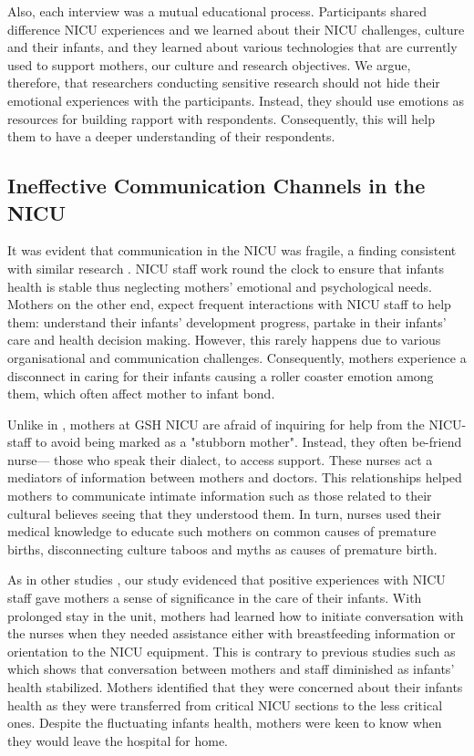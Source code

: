 Also, each interview was a mutual educational process. Participants shared difference NICU experiences and we learned about their NICU challenges, culture and their infants, and they learned about various technologies that are currently used to support mothers, our culture and research objectives. We argue, therefore, that researchers conducting sensitive research should not hide their emotional experiences with the participants. Instead, they should use emotions as resources for building rapport with respondents. Consequently, this will help them to have a deeper understanding of their respondents.

\subsection{Ineffective Communication Channels in the NICU}
It was evident that communication in the NICU was fragile, a finding consistent with similar research \citep{Flacking2007,Enlow2017, Wigert2006}. NICU staff work round the clock to ensure that infants health is stable thus neglecting mothers' emotional and psychological needs. Mothers on the other end, expect frequent interactions with NICU staff to help them: understand their infants' development progress, partake in their infants' care and health decision making. However, this rarely happens due to various organisational and communication challenges. Consequently, mothers experience a disconnect in caring for their infants causing a roller coaster emotion among them, which often affect mother to infant bond.

Unlike in \textcite{Turner2015, Wigert2014b}, mothers at GSH NICU are afraid of inquiring for help from the NICU-staff to avoid being marked as a "stubborn mother". Instead, they often be-friend nurse--- those who speak their dialect, to access support. These nurses act a mediators of information between  mothers and doctors. This relationships helped mothers to communicate intimate information such as those related to their cultural believes seeing that they understood them. In turn, nurses used their medical knowledge to educate such mothers on common causes of premature births, disconnecting culture taboos and myths as causes of premature birth.

As in other studies \citep{Gallagher2018, Wigert2014b}, our study evidenced that positive experiences with NICU staff gave mothers a sense of significance in the care of their infants. With prolonged stay in the unit, mothers had learned how to initiate conversation with the nurses when they needed assistance either with breastfeeding information or orientation to the NICU equipment. This is contrary to previous studies such as \citep{Fegran2008, Harrison2010} which shows that conversation between mothers and staff diminished as infants' health stabilized. Mothers identified that they were concerned about their infants health as they were transferred from critical NICU sections to the less critical ones. Despite the fluctuating infants health, mothers were keen to know when they would leave the hospital for home. 

